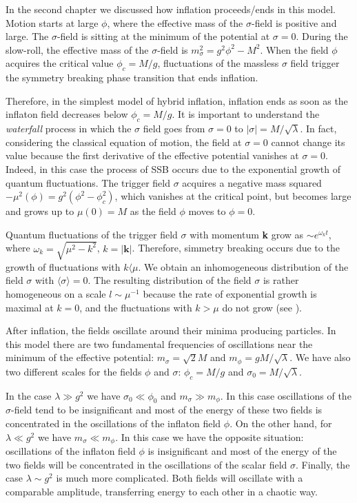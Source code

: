 \documentclass[11pt,a4paper,twoside]{book}
\begin{document}
In the second chapter we discussed how inflation proceeds/ends in this model. Motion starts at large $\phi$, where the effective mass of the $\sigma$-field is positive and large. The $\sigma$-field is sitting at the minimum of the potential at $\sigma=0$. During the slow-roll, the effective mass of the $\sigma$-field is $ m^{2}_{\sigma}=g^{2}\phi^{2}-M^{2} $. When the field $\phi$ acquires the critical value $ \phi_{c}=M/g $, fluctuations of the massless $\sigma$ field trigger the symmetry breaking phase transition that ends inflation.

Therefore, in the simplest model of hybrid inflation, inflation ends as soon as the inflaton field decreases below $ \phi_{c}=M/g $. It is important to understand the \textit{waterfall} process in which the $\sigma$ field goes from $ \sigma=0 $ to $ |\sigma|=M/\sqrt{\lambda} $. In fact, considering the classical equation of motion, the field  at $ \sigma = 0 $ cannot change its value because the first derivative of the effective potential vanishes at $ \sigma=0 $. Indeed, in this case the process of SSB occurs due to the exponential growth of quantum fluctuations. The trigger field $\sigma$ acquires a negative mass squared $ -\mu^{2}(\phi)=g^{2}(\phi^{2}-\phi_{c}^{2}) $, which vanishes at the critical point, but becomes large and grows up to $ \mu(0)=M $ as the field $\phi$ moves to $\phi=0$.

Quantum fluctuations of the trigger field $\sigma$ with momentum \textbf{k} grow as $\sim e^{\omega_{k} t}$, where $\omega_{k}=\sqrt{\mu^{2}-k^{2}}$, $ k=|\textbf{k}| $.  Therefore, simmetry breaking occurs due to the growth of fluctuations with $ k\langle \mu $. We obtain an inhomogeneous distribution of the field $\sigma$ with $ \langle \sigma\rangle =0 $. The resulting distribution of the field $\sigma$ is rather homogeneous on a scale $ l\sim \mu^{-1} $ because the rate of exponential growth is maximal at $ k=0 $, and the fluctuations with $ k>\mu $ do not grow (see \cite{Chap4:TachyonicPreheating}).

After inflation, the fields oscillate around their minima producing particles. In this model there are two fundamental frequencies of oscillations near the minimum of the effective potential: $ m_{\sigma}=\sqrt{2}M $ and $ m_{\phi}=gM/\sqrt{\lambda} $. We have also two different scales for the fields $\phi$ and $\sigma$: $ \phi_{c}=M/g $ and $\sigma_{0}=M/\sqrt{\lambda}$.

In the case $\lambda \gg g^{2}$ we have $ \sigma_{0}\ll\phi_{0} $ and $ m_{\sigma} \gg m_{\phi} $. In this case oscillations of the $\sigma$-field tend to be insignificant and most of the energy of these two fields is concentrated in the oscillations of the inflaton field $\phi$. On the other hand, for $\lambda \ll g^{2}$ we have $ m_{\sigma} \ll m_{\phi} $. In this case we have the opposite situation: oscillations of the inflaton field $\phi$ is insignificant and most of the energy of the two fields will be concentrated in the oscillations of the scalar field $\sigma$. Finally,  the case $ \lambda \sim g^{2} $ is much more complicated. Both fields will oscillate with a comparable amplitude, transferring energy to each other in a chaotic way.
\end{document}
